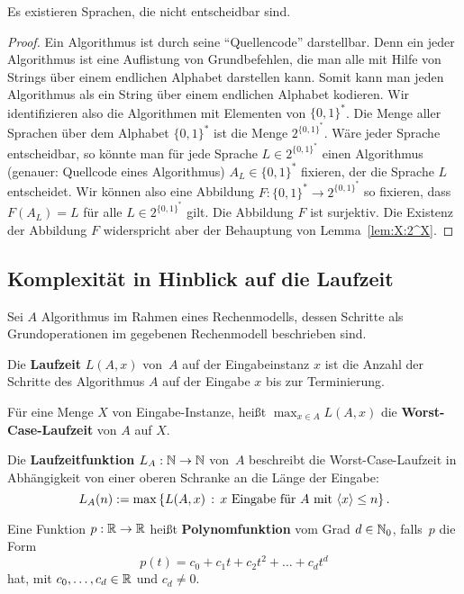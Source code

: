 \begin{thm}
	Es existieren Sprachen, die nicht entscheidbar sind. 
\end{thm} 
\begin{proof} 
		Ein Algorithmus ist durch seine ``Quellencode'' darstellbar. Denn ein jeder Algorithmus ist eine Auflistung von Grundbefehlen, die man alle mit Hilfe von Strings über einem endlichen Alphabet darstellen kann. Somit kann  man jeden Algorithmus als ein String über einem endlichen Alphabet kodieren. Wir identifizieren also die Algorithmen mit Elementen von $\{0,1\}^\ast$. Die Menge aller Sprachen über dem Alphabet $\{0,1\}^\ast$ ist die Menge $2^{\{0,1\}^\ast}$. Wäre jeder Sprache entscheidbar, so könnte man für jede Sprache $L \in 2^{\{0,1\}^\ast}$ einen Algorithmus (genauer: Quellcode eines Algorithmus) $A_L \in \{0,1\}^\ast$ fixieren, der die Sprache $L$ entscheidet. Wir können also eine Abbildung $F : \{0,1\}^\ast \to 2^{\{0,1\}^\ast}$ so fixieren, dass $F(A_L) = L$ für alle $L \in 2^{\{0,1\}^\ast}$ gilt. Die Abbildung $F$ ist surjektiv. Die Existenz der Abbildung $F$ widerspricht aber der Behauptung von Lemma~\ref{lem:X:2^X}.
\end{proof} 

\subsection{Komplexität in Hinblick auf die Laufzeit} 

\begin{defn} 
	Sei $A$ Algorithmus im Rahmen eines Rechenmodells, dessen Schritte als Grundoperationen im gegebenen Rechenmodell beschrieben sind. 

Die \textbf{Laufzeit} $L(A,x)$ von~$A$ auf der Eingabeinstanz $x$ ist die Anzahl der Schritte des Algorithmus $A$ auf der Eingabe $x$ bis zur Terminierung. 

Für eine Menge $X$ von Eingabe-Instanze, heißt $\max_{x \in A} L(A,x)$ die \textbf{Worst-Case-Laufzeit} von $A$ auf $X$. 

Die \textbf{Laufzeitfunktion} $L_A : \mathbb{N} \to \mathbb{N}$ von~$A$ beschreibt die Worst-Case-Laufzeit in Abhängigkeit von einer oberen Schranke an die Länge der Eingabe: 
\[
L_A(n) := \max \setcond{  L(A,x) }{x \ \text{Eingabe für} \ A  \ \text{mit} \ \encl{x} \le n}.
\]
\end{defn} 

\begin{defn}
	Eine Funktion $p : \mathbb{R} \to \mathbb{R}$ heißt \textbf{Polynomfunktion} vom Grad $d \in \mathbb{N}_0$, falls~$p$ die Form \[
		p(t)= c_0 + c_1 t + c_2 t^2 + \ldots + c_d t^d
	\]
	hat, mit $c_0,\ldots,c_d \in \mathbb{R}$ und $c_d \ne 0$. 
\end{defn} 

